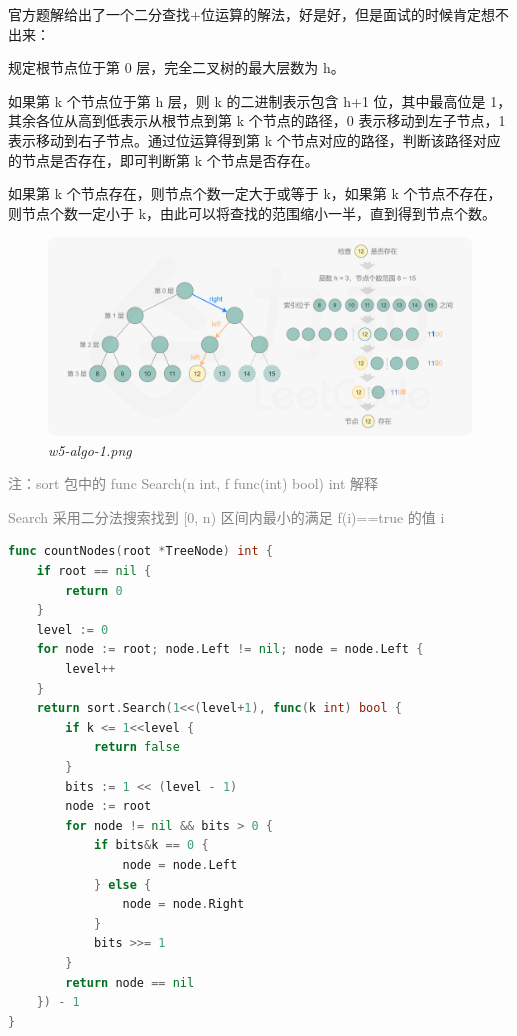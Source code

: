 官方题解给出了一个二分查找+位运算的解法，好是好，但是面试的时候肯定想不出来：

规定根节点位于第 0 层，完全二叉树的最大层数为 h。

如果第 k 个节点位于第 h 层，则 k 的二进制表示包含 h+1 位，其中最高位是 1，其余各位从高到低表示从根节点到第 k 个节点的路径，0 表示移动到左子节点，1 表示移动到右子节点。通过位运算得到第 k 个节点对应的路径，判断该路径对应的节点是否存在，即可判断第 k 个节点是否存在。

如果第 k 个节点存在，则节点个数一定大于或等于 k，如果第 k 个节点不存在，则节点个数一定小于 k，由此可以将查找的范围缩小一半，直到得到节点个数。

\begin{figure}[htbp]
  \centering
    \includegraphics[width=\textwidth]{../images/2020/12/w5-algo-1.png}
  \caption{\textit{w5-algo-1.png}}
\end{figure}

\begin{myquote}
\textcolor{gray}{注：sort 包中的 func Search(n int, f func(int) bool) int 解释}
\end{myquote}

\begin{myquote}
\textcolor{gray}{Search 采用二分法搜索找到 [0, n) 区间内最小的满足 f(i)==true 的值 i}
\end{myquote}

\begin{lstlisting}[language=go]
func countNodes(root *TreeNode) int {
	if root == nil {
		return 0
	}
	level := 0
	for node := root; node.Left != nil; node = node.Left {
		level++
	}
	return sort.Search(1<<(level+1), func(k int) bool {
		if k <= 1<<level {
			return false
		}
		bits := 1 << (level - 1)
		node := root
		for node != nil && bits > 0 {
			if bits&k == 0 {
				node = node.Left
			} else {
				node = node.Right
			}
			bits >>= 1
		}
		return node == nil
	}) - 1
}
\end{lstlisting}

